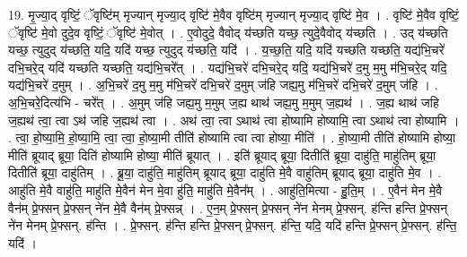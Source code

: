 \documentclass[17pt]{extarticle}
\begin{document}
19. मृ॒ज्या॒द् वृष्टिं॒ ॅवृष्टि॑म् मृज्यान् मृज्या॒द् वृष्टि॑ मे॒वैव वृष्टि॑म् मृज्यान् मृज्या॒द् वृष्टि॑ मे॒व । . वृष्टि॑ मे॒वैव वृष्टिं॒ ॅवृष्टि॑ मे॒वो दुदे॒व वृष्टिं॒ ॅवृष्टि॑ मे॒वोत् । . ए॒वोदुदे॒ वैवोद् य॑च्छति यच्छ॒ त्युदे॒वैवोद् य॑च्छति । . उद् य॑च्छति यच्छ॒ त्युदुद् य॑च्छति॒ यदि॒ यदि॑ यच्छ॒ त्युदुद् य॑च्छति॒ यदि॑ । . य॒च्छ॒ति॒ यदि॒ यदि॑ यच्छति यच्छति॒ यद्य॑भि॒चरे॑ दभि॒चरे॒द् यदि॑ यच्छति यच्छति॒ यद्य॑भि॒चरे᳚त् । . यद्य॑भि॒चरे॑ दभि॒चरे॒द् यदि॒ यद्य॑भि॒चरे॑ द॒मु म॒मु म॑भि॒चरे॒द् यदि॒ यद्य॑भि॒चरे॑ द॒मुम् । . अ॒भि॒चरे॑ द॒मु म॒मु म॑भि॒चरे॑ दभि॒चरे॑ द॒मुम् ज॑हि जह्य॒मु म॑भि॒चरे॑ दभि॒चरे॑ द॒मुम् ज॑हि । . अ॒भि॒चरे॒दित्य॑भि - चरे᳚त् । . अ॒मुम् ज॑हि जह्य॒मु म॒मुम् ज॒ह्य थाथ॑ जह्य॒मु म॒मुम् ज॒ह्यथ॑ । . ज॒ह्य थाथ॑ जहि ज॒ह्यथ॑ त्वा॒ त्वा ऽथ॑ जहि ज॒ह्यथ॑ त्वा । . अथ॑ त्वा॒ त्वा ऽथाथ॑ त्वा होष्यामि होष्यामि॒ त्वा ऽथाथ॑ त्वा होष्यामि । . त्वा॒ हो॒ष्या॒मि॒ हो॒ष्या॒मि॒ त्वा॒ त्वा॒ हो॒ष्या॒मी तीति॑ होष्यामि त्वा त्वा होष्या॒ मीति॑ । . हो॒ष्या॒मी तीति॑ होष्यामि होष्या॒ मीति॑ ब्रूयाद् ब्रूया॒ दिति॑ होष्यामि होष्या॒ मीति॑ ब्रूयात् । . इति॑ ब्रूयाद् ब्रूया॒ दितीति॑ ब्रूया॒ दाहु॑ति॒ माहु॑तिम् ब्रूया॒ दितीति॑ ब्रूया॒ दाहु॑तिम् । . ब्रू॒या॒ दाहु॑ति॒ माहु॑तिम् ब्रूयाद् ब्रूया॒ दाहु॑ति मे॒वै वाहु॑तिम् ब्रूयाद् ब्रूया॒ दाहु॑ति मे॒व । . आहु॑ति मे॒वै वाहु॑ति॒ माहु॑ति मे॒वैन॑ मेन मे॒वा हु॑ति॒ माहु॑ति मे॒वैन᳚म् । . आहु॑ति॒मित्या - हु॒ति॒म् । . ए॒वैन॑ मेन मे॒वै वैन॑म् प्रे॒फ्सन् प्रे॒फ्सन् ने॑न मे॒वै वैन॑म् प्रे॒फ्सन्न् । . ए॒न॒म् प्रे॒फ्सन् प्रे॒फ्सन् ने॑न मेनम् प्रे॒फ्सन्. ह॑न्ति हन्ति प्रे॒फ्सन् ने॑न मेनम् प्रे॒फ्सन्. ह॑न्ति । . प्रे॒फ्सन्. ह॑न्ति हन्ति प्रे॒फ्सन् प्रे॒फ्सन्. ह॑न्ति॒ यदि॒ यदि॑ हन्ति प्रे॒फ्सन् प्रे॒फ्सन्. ह॑न्ति॒ यदि॑ । \newline
\end{document}
